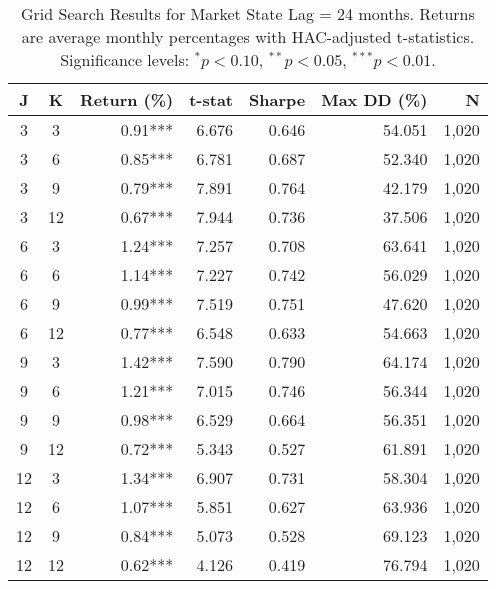 \begin{table}[htbp]
\caption{Grid Search Results for Market State Lag = 24 months. Returns are average monthly percentages with HAC-adjusted t-statistics. Significance levels: $^{*}p<0.10$, $^{**}p<0.05$, $^{***}p<0.01$.}
\label{tab:grid_search_lag24}
\begin{tabular}{cc|rrrrr}
\toprule
J & K & Return (\%) & t-stat & Sharpe & Max DD (\%) & N \\
\midrule
3 & 3 & 0.91*** & 6.676 & 0.646 & 54.051 & 1,020 \\
3 & 6 & 0.85*** & 6.781 & 0.687 & 52.340 & 1,020 \\
3 & 9 & 0.79*** & 7.891 & 0.764 & 42.179 & 1,020 \\
3 & 12 & 0.67*** & 7.944 & 0.736 & 37.506 & 1,020 \\
6 & 3 & 1.24*** & 7.257 & 0.708 & 63.641 & 1,020 \\
6 & 6 & 1.14*** & 7.227 & 0.742 & 56.029 & 1,020 \\
6 & 9 & 0.99*** & 7.519 & 0.751 & 47.620 & 1,020 \\
6 & 12 & 0.77*** & 6.548 & 0.633 & 54.663 & 1,020 \\
9 & 3 & 1.42*** & 7.590 & 0.790 & 64.174 & 1,020 \\
9 & 6 & 1.21*** & 7.015 & 0.746 & 56.344 & 1,020 \\
9 & 9 & 0.98*** & 6.529 & 0.664 & 56.351 & 1,020 \\
9 & 12 & 0.72*** & 5.343 & 0.527 & 61.891 & 1,020 \\
12 & 3 & 1.34*** & 6.907 & 0.731 & 58.304 & 1,020 \\
12 & 6 & 1.07*** & 5.851 & 0.627 & 63.936 & 1,020 \\
12 & 9 & 0.84*** & 5.073 & 0.528 & 69.123 & 1,020 \\
12 & 12 & 0.62*** & 4.126 & 0.419 & 76.794 & 1,020 \\
\bottomrule
\end{tabular}
\end{table}
